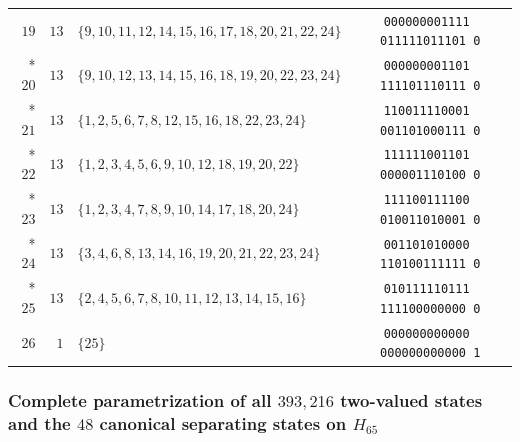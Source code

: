 \documentclass[aps,pra,reprint,superscriptaddress,longbibliography,nofootinbib,floatfix,10pt]{revtex4-2}
\theoremstyle{definition}
\begin{document}
\begin{longtable}{rrlc}
$19$ & $13$ & $\{9,10,11,12,14,15,16,17,18,20,21,22,24\}$ & \texttt{000000001111\,011111011101\,0} \\*
$20$ & $13$ & $\{9,10,12,13,14,15,16,18,19,20,22,23,24\}$ & \texttt{000000001101\,111101110111\,0} \\*
$21$ & $13$ & $\{1,2,5,6,7,8,12,15,16,18,22,23,24\}$ & \texttt{110011110001\,001101000111\,0} \\*
$22$ & $13$ & $\{1,2,3,4,5,6,9,10,12,18,19,20,22\}$ & \texttt{111111001101\,000001110100\,0} \\*
$23$ & $13$ & $\{1,2,3,4,7,8,9,10,14,17,18,20,24\}$ & \texttt{111100111100\,010011010001\,0} \\*
$24$ & $13$ & $\{3,4,6,8,13,14,16,19,20,21,22,23,24\}$ & \texttt{001101010000\,110100111111\,0} \\*
$25$ & $13$ & $\{2,4,5,6,7,8,10,11,12,13,14,15,16\}$ & \texttt{010111110111\,111100000000\,0} \\ \hline
$26$ & $1$ & $\{25\}$ & \texttt{000000000000\,000000000000\,1}
\end{longtable}
\endgroup

\subsubsection{Complete parametrization of all \texorpdfstring{$393{,}216$}{393,216} two-valued states and the \texorpdfstring{$48$}{48} canonical separating states on \texorpdfstring{$H_{65}$}{H\_65}}\label{d:app:states-h65}
\end{document}
